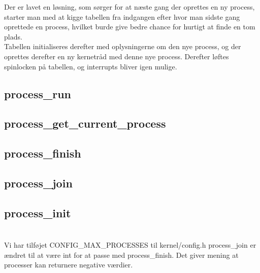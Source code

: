 \documentclass[10pt,a4paper,danish]{article}
\begin{document}
Der er lavet en løsning, som sørger for at næste gang der oprettes en ny process, starter man med at kigge tabellen fra indgangen efter hvor man sidste gang oprettede en process, hvilket burde give bedre chance for hurtigt at finde en tom plads.\\

Tabellen initialiseres derefter med oplysningerne om den nye process, og der oprettes derefter en ny kernetråd med denne nye process. Derefter løftes spinlocken på tabellen, og interrupts bliver igen mulige. 

\subsection{process\_run}


\subsection{process\_get\_current\_process}

\subsection{process\_finish}

\subsection{process\_join}

\subsection{process\_init}

\section{}

Vi har tilføjet CONFIG\_MAX\_PROCESSES til kernel/config.h
process\_join er ændret til at være int for at passe med process\_finish. Det giver mening at processer kan returnere negative værdier.
\end{document}
